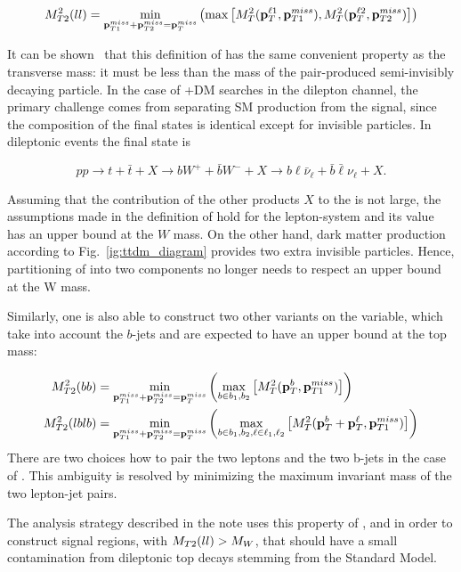   \begin{equation}
    \label{eq:mt2ll}
    M_{T2}^2(ll) = \min_{\mathbf{p}_{T1}^{miss} + \mathbf{p}_{T2}^{miss} = \mathbf{p}_T^{miss}} \left( \max \left[ M_{T}^2(\mathbf{p}_T^{\ell1},\mathbf{p}_{T1}^{miss}) , M_{T}^2(\mathbf{p}_T^{\ell2},\mathbf{p}_{T2}^{miss}) \right] \right)
  \end{equation}

  It can be shown~\cite{Lester:1999tx} that this definition of \mtll has the same convenient property as the transverse mass: 
  it must be less than the mass of the pair-produced semi-invisibly decaying particle.
  In the case of \ttbar+DM searches in the dilepton channel, the primary challenge comes from separating SM \ttbar 
  production from the signal, since the composition of the final states is identical except
  for invisible particles. In dileptonic \ttbar events the final state is

  \begin{equation*}
    pp \to t + \bar{t} + X \to bW^+ + \bar{b}W^- + X \to b\ell\bar{\nu}_\ell + \bar{b}\bar{\ell}\nu_\ell + X.  
  \end{equation*}

  Assuming that the contribution of the other products $X$ to the \met is not large, the assumptions
  made in the definition of \mtll hold for the lepton-\met system and its value has an upper
  bound at the $W$ mass. On the other hand, dark matter production according to Fig.~\ref{ig:ttdm_diagram}
  provides two extra invisible particles.
  Hence, partitioning of  \met into two components no longer needs to respect an upper bound at the W mass.

  Similarly, one is also able to construct two other variants on the \mtll variable, which take into account the $b$-jets and are expected to have an upper bound at the top mass:

  \begin{align}
    \label{eq:mt2bb}
    M_{T2}^2(bb)   &= \min_{\mathbf{p}_{T1}^{miss} + \mathbf{p}_{T2}^{miss} = \mathbf{p}_T^{miss}} \left( \max_{b \in b_1,b_2} \left[ M_{T}^2(\mathbf{p}_T^{b},\mathbf{p}_{T1}^{miss}) \right] \right) \\
    M_{T2}^2(lblb) &= \min_{\mathbf{p}_{T1}^{miss} + \mathbf{p}_{T2}^{miss} = \mathbf{p}_T^{miss}} \left( \max_{b \in b_1,b_2, \ell \in \ell_1, \ell_2} \left[ M_{T}^2(\mathbf{p}_T^{b} + \mathbf{p}_T^{\ell}, \mathbf{p}_{T1}^{miss}) \right] \right)
  \end{align}
  There are two choices how to pair the two leptons  and the two b-jets in the case of \mtlblb. This ambiguity is resolved by minimizing the maximum invariant mass of the two lepton-jet pairs.

  The analysis strategy described in the note uses this property of \mtll, \mtbb and \mtlblb in order to construct
  signal regions, with $M_{T2}(ll) > M_W$, that should have a small
  contamination from dileptonic top decays stemming from the Standard Model.
